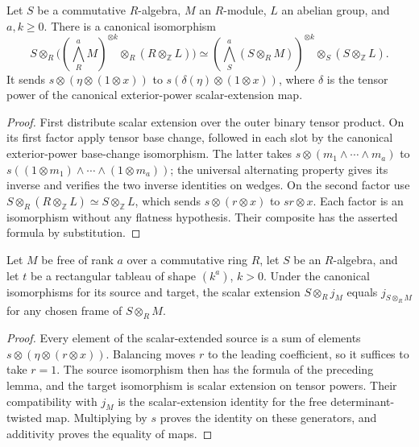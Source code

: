 \begin{lemma}
\label{lem:determinant-twist-base-change-equivalence}
\leanok
Let $S$ be a commutative $R$-algebra, $M$ an $R$-module, $L$ an
abelian group, and $a,k\geq0$. There is a canonical isomorphism
\[
 S\otimes_R\bigl((\bigwedge_R^aM)^{\otimes k}\otimes_R
 (R\otimes_{\mathbb Z}L)\bigr)
 \simeq
 (\bigwedge_S^a(S\otimes_R M))^{\otimes k}\otimes_S
 (S\otimes_{\mathbb Z}L).
\]
It sends $s\otimes(\eta\otimes(1\otimes x))$ to
$s(\delta(\eta)\otimes(1\otimes x))$, where $\delta$ is the tensor
power of the canonical exterior-power scalar-extension map.
\end{lemma}
\begin{proof}
First distribute scalar extension over the outer binary tensor
product. On its first factor apply tensor base change, followed in
each slot by the canonical exterior-power base-change isomorphism.
The latter takes $s\otimes(m_1\wedge\cdots\wedge m_a)$ to
$s((1\otimes m_1)\wedge\cdots\wedge(1\otimes m_a))$; the universal
alternating property gives its inverse and verifies the two inverse
identities on wedges. On the second factor use
$S\otimes_R(R\otimes_{\mathbb Z}L)\simeq S\otimes_{\mathbb Z}L$,
which sends $s\otimes(r\otimes x)$ to $s r\otimes x$.
Each factor is an isomorphism without any flatness hypothesis.
Their composite has the asserted formula by substitution.
\end{proof}

\begin{lemma}
\label{lem:determinant-free-base-change-square}
\leanok
Let $M$ be free of rank $a$ over a commutative ring $R$, let $S$ be
an $R$-algebra, and let $t$ be a rectangular tableau of shape $(k^a)$,
$k>0$. Under the canonical isomorphisms for its source and target,
the scalar extension $S\otimes_R j_M$ equals $j_{S\otimes_R M}$
for any chosen frame of $S\otimes_R M$.
\end{lemma}
\begin{proof}
Every element of the scalar-extended source is a sum of elements
$s\otimes(\eta\otimes(r\otimes x))$. Balancing moves $r$ to the
leading coefficient, so it suffices to take $r=1$. The source
isomorphism then has the formula of the preceding lemma, and the
target isomorphism is scalar extension on tensor powers. Their
compatibility with $j_M$ is the scalar-extension identity for the
free determinant-twisted map. Multiplying by $s$ proves the identity
on these generators, and additivity proves the equality of maps.
\end{proof}

